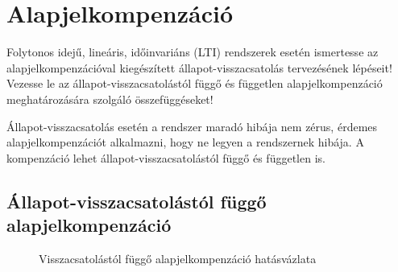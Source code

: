 \section{Alapjelkompenzáció}

\begin{about}
  Folytonos idejű, lineáris, időinvariáns (LTI) rendszerek esetén ismertesse
  az alapjelkompenzációval kiegészített állapot-visszacsatolás tervezésének
  lépéseit! Vezesse le az állapot-visszacsatolástól függő és független
  alapjelkompenzáció meghatározására szolgáló összefüggéseket!
\end{about}

Állapot-visszacsatolás esetén a rendszer maradó hibája nem zérus, érdemes
alapjelkompenzációt alkalmazni, hogy ne legyen a rendszernek hibája. A
kompenzáció lehet állapot-visszacsato\-lástól függő és független is.

\subsection{Állapot-visszacsatolástól függő alapjelkompenzáció}

\begin{figure}[htb]
  \centering
  
  \caption{Visszacsatolástól függő alapjelkompenzáció hatásvázlata}
  \label{fig:K-feedback}
\end{figure}

